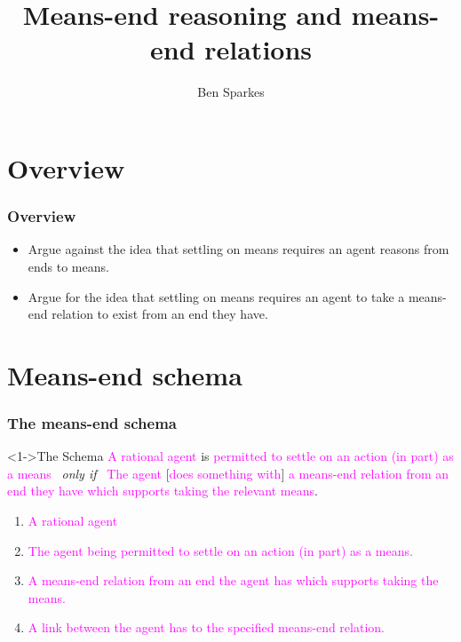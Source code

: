 \documentclass[noamssymb,
]{beamer} %
\title{Means-end reasoning and means-end relations}
\author{Ben Sparkes}
\begin{document}
\begin{frame}[noframenumbering]
  \titlepage
\end{frame}


\section*{Overview}
\label{sec:overview}

\begin{frame}
  \frametitle{Overview}

  \begin{itemize}
  \item Argue against the idea that settling on means requires an agent reasons from ends to means.
  \item Argue for the idea that settling on means requires an agent to take a means-end relation to exist from an end they have.
  \end{itemize}
\end{frame}


\section{Means-end schema}
\label{sec:schema}

\begin{frame}
  \frametitle{The means-end schema}

  \begin{block}<1->{The Schema}
    \textcolor<3>{fuchsia}{A rational agent} is \textcolor<4>{fuchsia}{permitted to settle on an action (in part) as a means}
    \newline
    \mbox{ }\hfill\emph{only if}\hfill\mbox{ }
    \newline
    \textcolor<3>{fuchsia}{The agent} [\textcolor<6>{fuchsia}{does something with}] \textcolor<5>{fuchsia}{a means-end relation from an end they have which supports taking the relevant means}.
  \end{block}

  \begin{enumerate}%
  \item<3-6> \textcolor<3>{fuchsia}{A rational agent}
  \item<4-6> \textcolor<4>{fuchsia}{The agent being permitted to settle on an action (in part) as a means.}
  \item<5-6> \textcolor<5>{fuchsia}{A means-end relation from an end the agent has which supports taking the means.}
  \item<6-6> \textcolor<6>{fuchsia}{A link between the agent has to the specified means-end relation.}
  \end{enumerate}
\end{frame}
\end{document}
